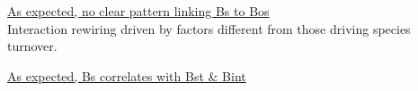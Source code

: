\documentclass[11pt]{article}
\begin{document}
\underline{As expected, no clear pattern linking Bs to Bos} \\
Interaction rewiring driven by factors different from those driving species turnover. \\
\begin{figure}[H]
  \label{fig:plant-bee}
\end{figure}

\newpage
\underline{As expected, Bs correlates with Bst \& Bint} \\
\begin{figure}[H]
  \label{fig:plant-bee}
\end{figure}
\end{document}
